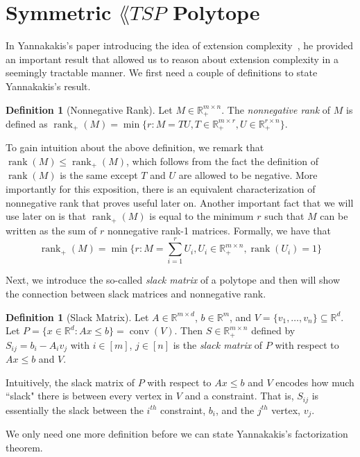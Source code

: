 \documentclass{article}
\theoremstyle{definition}
\newtheorem{definition}[theorem]{Definition}
\theoremstyle{remark}
\newcommand{\nrank}{\operatorname{rank}_+}
\newcommand{\rank}{\operatorname{rank}}
\newcommand{\conv}{\operatorname{conv}}
\renewcommand{\R}{\mathbb{R}}
\begin{document}
\section{Symmetric $\lang{TSP}$ Polytope}\label{sec:symmetric-tsp}

In Yannakakis's paper introducing the idea of extension complexity~\cite{yannakakis}, he provided an important result that allowed us to reason about extension complexity in a seemingly tractable manner. We first need a couple of definitions to state Yannakakis's result.

\begin{definition}[Nonnegative Rank]
Let $M \in \R_+^{m \times n}$. The \emph{nonnegative rank} of $M$ is defined as $\nrank(M) = \min\{r : M = TU, T \in \R_+^{m \times r}, U \in \R_+^{r \times n}\}$.
\end{definition}

To gain intuition about the above definition, we remark that $\rank(M) \le \nrank(M)$, which follows from the fact the definition of $\rank(M)$ is the same except $T$ and $U$ are allowed to be negative. More importantly for this exposition, there is an equivalent characterization of nonnegative rank that proves useful later on. Another important fact that we will use later on is that $\nrank(M)$ is equal to the minimum $r$ such that $M$ can be written as the sum of $r$ nonnegative rank-1 matrices. Formally, we have that 
\[
\nrank(M) = \min\{r : M =\sum_{i=1}^r U_i, U_i \in \R_+^{m \times n}, \rank(U_i) = 1\}
\]

Next, we introduce the so-called \emph{slack matrix} of a polytope and then will show the connection between slack matrices and nonnegative rank.

\begin{definition}[Slack Matrix]
Let $A \in \R^{m \times d}$, $b \in \R^m$, and $V = \{v_1, \ldots, v_n\} \subseteq \R^d$. Let $P = \{x \in \R^d : Ax \le b\} = \conv(V)$. Then $S \in \R_+^{m\times n}$ defined by $S_{ij} = b_i - A_i v_j$ with $i \in [m]$, $j \in [n]$ is the \emph{slack matrix} of $P$ with respect to $Ax \le b$ and $V$.
\end{definition}

Intuitively, the slack matrix of $P$ with respect to $Ax \le b$ and $V$ encodes how much ``slack" there is between every vertex in $V$ and a constraint. That is, $S_{ij}$ is essentially the slack between the $i^{th}$ constraint, $b_i$, and the $j^{th}$ vertex, $v_j$.

We only need one more definition before we can state Yannakakis's factorization theorem. 
\end{document}
